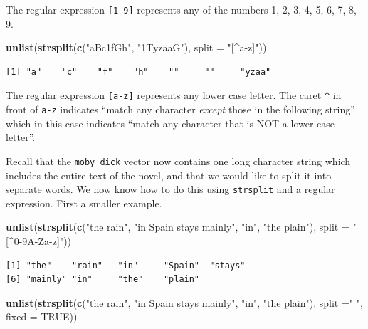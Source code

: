 \documentclass[
]{krantz}
\makeatletter
\newenvironment{Shaded}{\begin{snugshade}}{\end{snugshade}}
\newcommand{\DataTypeTok}[1]{\textcolor[rgb]{0.27,0.27,0.27}{#1}}
\newcommand{\KeywordTok}[1]{\textcolor[rgb]{0.27,0.27,0.27}{\textbf{#1}}}
\newcommand{\NormalTok}[1]{#1}
\newcommand{\OtherTok}[1]{\textcolor[rgb]{0.37,0.37,0.37}{#1}}
\newcommand{\StringTok}[1]{\textcolor[rgb]{0.5,0.5,0.5}{#1}}
\newenvironment{kframe}{%
\medskip{}
\setlength{\fboxsep}{.8em}
 \def\at@end@of@kframe{}%
 \ifinner\ifhmode%
  \def\at@end@of@kframe{\end{minipage}}%
  \begin{minipage}{\columnwidth}%
 \fi\fi%
 \def\FrameCommand##1{\hskip\@totalleftmargin \hskip-\fboxsep
 \colorbox{shadecolor}{##1}\hskip-\fboxsep
     \hskip-\linewidth \hskip-\@totalleftmargin \hskip\columnwidth}%
 \MakeFramed {\advance\hsize-\width
   \@totalleftmargin\z@ \linewidth\hsize
   \@setminipage}}%
 {\par\unskip\endMakeFramed%
 \at@end@of@kframe}
\renewenvironment{Shaded}{\begin{kframe}}{\end{kframe}}
\makeatother
\begin{document}
The regular expression \texttt{{[}1-9{]}} represents any of the numbers 1, 2, 3, 4, 5, 6, 7, 8, 9.

\begin{Shaded}
\begin{Highlighting}[]
\KeywordTok{unlist}\NormalTok{(}\KeywordTok{strsplit}\NormalTok{(}\KeywordTok{c}\NormalTok{(}\StringTok{"aBc1fGh"}\NormalTok{, }\StringTok{"1TyzaaG"}\NormalTok{), }\DataTypeTok{split =} \StringTok{"[\^{}a{-}z]"}\NormalTok{))}
\end{Highlighting}
\end{Shaded}

\begin{verbatim}
[1] "a"    "c"    "f"    "h"    ""     ""     "yzaa"
\end{verbatim}

The regular expression \texttt{{[}a-z{]}} represents any lower case letter. The caret \texttt{\^{}} in front of \texttt{a-z} indicates ``match any character \emph{except} those in the following string'' which in this case indicates ``match any character that is NOT a lower case letter''.

Recall that the \texttt{moby\_dick} vector now contains one long character string which includes the entire text of the novel, and that we would like to split it into separate words. We now know how to do this using \texttt{strsplit} and a regular expression. First a smaller example.

\begin{Shaded}
\begin{Highlighting}[]
\KeywordTok{unlist}\NormalTok{(}\KeywordTok{strsplit}\NormalTok{(}\KeywordTok{c}\NormalTok{(}\StringTok{"the rain"}\NormalTok{, }\StringTok{"in Spain stays mainly"}\NormalTok{, }\StringTok{"in"}\NormalTok{, }\StringTok{"the plain"}\NormalTok{), }
                \DataTypeTok{split =} \StringTok{"[\^{}0{-}9A{-}Za{-}z]"}\NormalTok{))}
\end{Highlighting}
\end{Shaded}

\begin{verbatim}
[1] "the"    "rain"   "in"     "Spain"  "stays" 
[6] "mainly" "in"     "the"    "plain" 
\end{verbatim}

\begin{Shaded}
\begin{Highlighting}[]
\KeywordTok{unlist}\NormalTok{(}\KeywordTok{strsplit}\NormalTok{(}\KeywordTok{c}\NormalTok{(}\StringTok{"the rain"}\NormalTok{, }\StringTok{"in Spain stays mainly"}\NormalTok{, }\StringTok{"in"}\NormalTok{, }\StringTok{"the plain"}\NormalTok{), }
                \DataTypeTok{split =}\StringTok{" "}\NormalTok{, }\DataTypeTok{fixed =} \OtherTok{TRUE}\NormalTok{))}
\end{Highlighting}
\end{Shaded}
\end{document}
